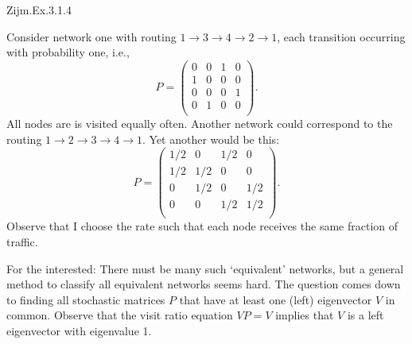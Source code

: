 \begin{exercise}
Zijm.Ex.3.1.4
\begin{solution}
Consider network one with routing $1\to3\to4\to2\to1$, each transition occurring with probability one, i.e.,
\begin{equation*}
 P =
 \begin{pmatrix}
 0 & 0 & 1 & 0 \\
 1 & 0 & 0 & 0 \\
 0 & 0 & 0 & 1 \\
 0 & 1 & 0 & 0 \\
 \end{pmatrix}.
\end{equation*}
All nodes are is visited equally often. Another network could correspond to the routing $1\to2\to3\to4\to1$. Yet another would be this:
\begin{equation*}
 P =
 \begin{pmatrix}
 1/2 & 0 & 1/2 & 0 \\
 1/2 & 1/2 & 0 & 0 \\
 0 & 1/2 & 0 & 1/2 \\
 0 & 0 & 1/2 & 1/2 \\
 \end{pmatrix}.
\end{equation*}
Observe that I choose the rate such that each node receives the same
fraction of traffic.

For the interested: There must be many such `equivalent' networks, but
a general method to classify all equivalent networks seems hard. The
question comes down to finding all stochastic matrices $P$ that have
at least one (left) eigenvector $V$ in common. Observe that the visit
ratio equation $VP=V$ implies that $V$ is a left eigenvector with
eigenvalue 1.
\end{solution}
\end{exercise}

